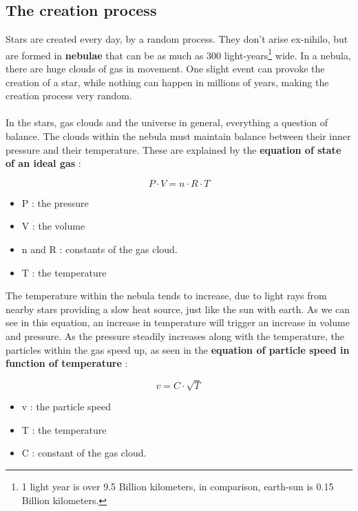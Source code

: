 \documentclass[a4paper, 11pt]{article} %
\begin{document}
\subsection{The creation process}
Stars are created every day, by a random process. They don't arise ex-nihilo, but are formed in \textbf{nebulae} that can be as much as 300 light-years\footnote{ 1 light year is over 9.5 Billion kilometers, in comparison, earth-sun is 0.15 Billion kilometers.} wide. In a nebula, there are huge clouds of gas in movement. One slight event can provoke the creation of a star, while nothing can happen in millions of years, making the creation process very random.

\paragraph*{}
In the stars, gas clouds and the universe in general, everything  a question of balance. The clouds within the nebula must maintain balance between their inner pressure and their temperature. These are explained by the \textbf{equation of state of an ideal gas} : 
\label{GP}
\begin{multicols}{2}

\begin{equation}
P\cdot V = n \cdot R \cdot T
\end{equation}
\vspace{2cm}
\begin{itemize}
\item P : the pressure
\item V : the volume
\item n and R : constants of the gas cloud.
\item T : the temperature 
\end{itemize}
\end{multicols}

The temperature within the nebula tends to increase, due to light rays from nearby stars providing a slow heat source, just like the sun with earth. As we can see in this equation, an increase in temperature will trigger an increase in volume and pressure. As the pressure steadily increases along with the temperature, the particles within the gas speed up, as seen in the \textbf{equation of particle speed in function of temperature} :

\begin{multicols}{2}

\begin{equation}
v = C \cdot \sqrt{T}
\end{equation}
\vspace{2cm}
\begin{itemize}
\item v : the particle speed
\item T : the temperature
\item C : constant of the gas cloud. 
\end{itemize}
\end{multicols}
\end{document}
